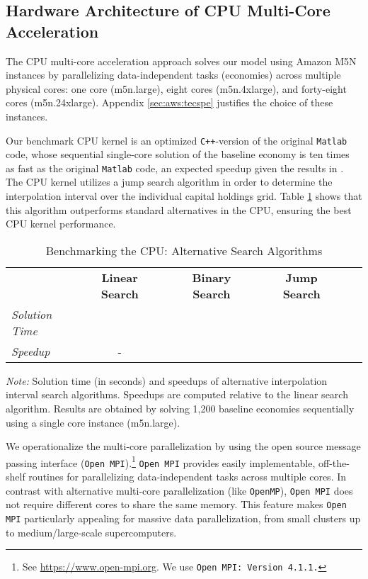 \documentclass[12pt,american]{article}
\makeatletter
\newcommand{\resultsfolder}{./results}
\newcommand{\devcpu}{cpu-cores}
\newcommand{\nKMIkI}{nKM4-nk100}
\newcommand{\cpuI}{m5n.large\@\xspace}
\newcommand{\cpucoreI}{1}
\newcommand{\cpuII}{m5n.4xlarge\@\xspace}
\newcommand{\cpuIII}{m5n.24xlarge\@\xspace}
\newcommand{\cpulineartime}{}
\newcommand{\cpubinarytime}{}
\newcommand{\cpujumpsearchtime}{}
\newcommand{\cpubinaryspeedup}{}
\newcommand{\cpujumpsearchspeedup}{}
\newcommand{\numbeconII}{1,200\@\xspace}
\newcommand{\speedCvsMatlab}{ten times}
\makeatother
\begin{document}
\subsection{Hardware Architecture of CPU Multi-Core Acceleration}\label{sec:cpuacc}

The CPU multi-core acceleration approach solves our model using Amazon M5N instances by parallelizing data-independent tasks (economies) across multiple physical cores: one core (\cpuI), eight cores (\cpuII), and forty-eight cores (\cpuIII). Appendix \ref{sec:aws:tecspe} justifies the choice of these instances.

Our benchmark CPU kernel is an optimized \texttt{C++}-version of the original \citet{MaliarMaliarValli2010} \texttt{Matlab} code, whose sequential single-core solution of the baseline economy is \speedCvsMatlab\, as fast as the original \texttt{Matlab} code, an expected speedup given the results in \citet{Aruoba2015}. The CPU kernel utilizes a jump search algorithm in order to determine the interpolation interval over the individual capital holdings grid. Table \ref{tab:CPUben} shows that this algorithm outperforms standard alternatives in the CPU, ensuring the best CPU kernel performance.

\begin{table}[ht!]
\caption{Benchmarking the CPU: Alternative Search Algorithms}
\vspace{-0.1in}
\begin{center}
\setlength\tabcolsep{4pt}
\begin{tabular}{@{\extracolsep{\fill}}lccccccc}
\toprule
&\multicolumn{1}{c}{\textbf{Linear Search}}&
&\multicolumn{1}{c}{\textbf{Binary Search}}&
&\multicolumn{1}{c}{\textbf{Jump Search}}\\
\textit{Solution Time} &\cpulineartime &&\cpubinarytime &&\cpujumpsearchtime\\
\textit{Speedup} & - &&\cpubinaryspeedup &&\cpujumpsearchspeedup\\ 
\bottomrule
\end{tabular}
\label{tab:CPUben}
\end{center}
\small \textit{Note:} 
Solution time (in seconds) and speedups of alternative interpolation interval search algorithms. Speedups are computed relative to the linear search algorithm. Results are obtained by solving \numbeconII baseline economies sequentially using a single core instance (\cpuI).
\end{table}

We operationalize the multi-core parallelization by using the open source message passing interface (\texttt{Open MPI}).\footnote{See \href{https://www.open-mpi.org}{https://www.open-mpi.org}. We use \texttt{Open MPI: Version 4.1.1.}} \texttt{Open MPI} provides easily implementable, off-the-shelf routines for parallelizing data-independent tasks across multiple cores. In contrast with alternative multi-core parallelization (like \texttt{OpenMP}), \texttt{Open MPI} does not require different cores to share the same memory. This feature makes \texttt{Open MPI} particularly appealing for massive data parallelization, from small clusters up to medium/large-scale supercomputers.
\end{document}
